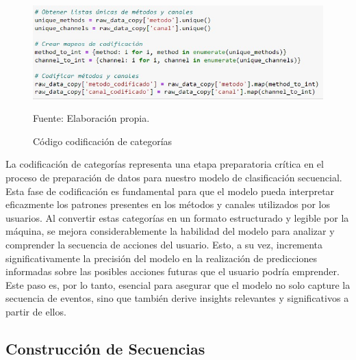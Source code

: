 \begin{figure}[H]
    \begin{minipage}[t]{0.9\textwidth}
        \caption{Código codificación de categorías}
        \label{codificación_categorias}        
    \end{minipage}

    \vspace{10pt}

    \begin{minipage}[b]{1\textwidth}
        \centering
        \includegraphics[width=\textwidth]{img/Código codificación categorias.jpg}        
    \end{minipage}

    \begin{minipage}[t]{0.9\textwidth}
        Fuente: Elaboración propia.
    \end{minipage}
\end{figure}

La codificación de categorías representa una etapa preparatoria crítica en el proceso de preparación de datos para nuestro modelo de clasificación secuencial. Esta fase de codificación es fundamental para que el modelo pueda interpretar eficazmente los patrones presentes en los métodos y canales utilizados por los usuarios. Al convertir estas categorías en un formato estructurado y legible por la máquina, se mejora considerablemente la habilidad del modelo para analizar y comprender la secuencia de acciones del usuario. Esto, a su vez, incrementa significativamente la precisión del modelo en la realización de predicciones informadas sobre las posibles acciones futuras que el usuario podría emprender. Este paso es, por lo tanto, esencial para asegurar que el modelo no solo capture la secuencia de eventos, sino que también derive insights relevantes y significativos a partir de ellos.

\subsection{Construcción de Secuencias}

